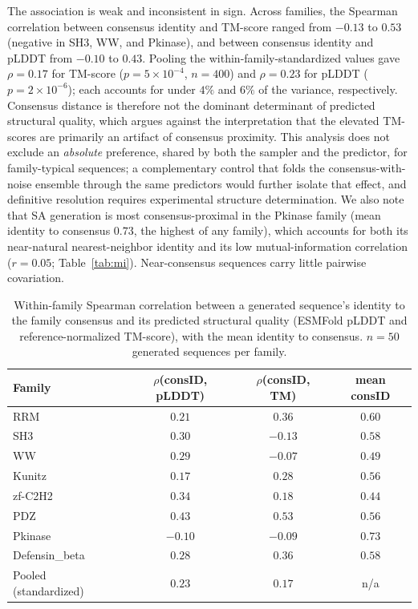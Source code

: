 The association is weak and inconsistent in sign. Across families, the Spearman correlation between consensus identity and TM-score ranged from $-0.13$ to $0.53$ (negative in SH3, WW, and Pkinase), and between consensus identity and pLDDT from $-0.10$ to $0.43$. Pooling the within-family-standardized values gave $\rho{=}0.17$ for TM-score ($p{=}5\times10^{-4}$, $n{=}400$) and $\rho{=}0.23$ for pLDDT ($p{=}2\times10^{-6}$); each accounts for under $4\%$ and $6\%$ of the variance, respectively. Consensus distance is therefore not the dominant determinant of predicted structural quality, which argues against the interpretation that the elevated TM-scores are primarily an artifact of consensus proximity. This analysis does not exclude an \emph{absolute} preference, shared by both the sampler and the predictor, for family-typical sequences; a complementary control that folds the consensus-with-noise ensemble through the same predictors would further isolate that effect, and definitive resolution requires experimental structure determination. We also note that SA generation is most consensus-proximal in the Pkinase family (mean identity to consensus $0.73$, the highest of any family), which accounts for both its near-natural nearest-neighbor identity and its low mutual-information correlation ($r{=}0.05$; Table~\ref{tab:mi}). Near-consensus sequences carry little pairwise covariation.

\begin{table}[ht]
\centering
\caption{Within-family Spearman correlation between a generated sequence's identity to the family consensus and its predicted structural quality (ESMFold pLDDT and reference-normalized TM-score), with the mean identity to consensus. $n{=}50$ generated sequences per family.}
\label{tab:consensus-reg}
\small
\begin{tabular}{@{}lccc@{}}
\toprule
Family & $\rho$(consID, pLDDT) & $\rho$(consID, TM) & mean consID \\
\midrule
RRM            & $0.21$  & $0.36$  & $0.60$ \\
SH3            & $0.30$  & $-0.13$ & $0.58$ \\
WW             & $0.29$  & $-0.07$ & $0.49$ \\
Kunitz         & $0.17$  & $0.28$  & $0.56$ \\
zf-C2H2        & $0.34$  & $0.18$  & $0.44$ \\
PDZ            & $0.43$  & $0.53$  & $0.56$ \\
Pkinase        & $-0.10$ & $-0.09$ & $0.73$ \\
Defensin\_beta & $0.28$  & $0.36$  & $0.58$ \\
\midrule
Pooled (standardized) & $0.23$ & $0.17$ & n/a \\
\bottomrule
\end{tabular}
\end{table}

